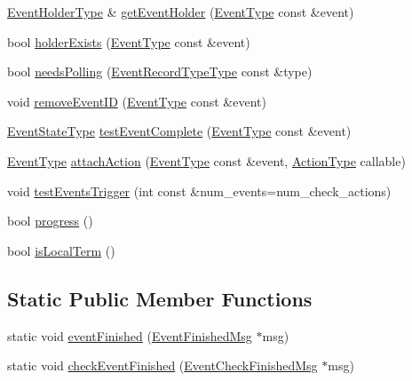 \begin{DoxyCompactItemize}
\item 
\hyperlink{structvt_1_1event_1_1_async_event_a6b529d829ccb5b12c50c2b1978c41a86}{Event\+Holder\+Type} \& \hyperlink{structvt_1_1event_1_1_async_event_a27d14dba4b35f66aad75d46fb56227a9}{get\+Event\+Holder} (\hyperlink{namespacevt_a009267401def7ae8bf201892222d060f}{Event\+Type} const \&event)
\item 
bool \hyperlink{structvt_1_1event_1_1_async_event_a8aeeb83c7b467b3d130e522d079e5a7d}{holder\+Exists} (\hyperlink{namespacevt_a009267401def7ae8bf201892222d060f}{Event\+Type} const \&event)
\item 
bool \hyperlink{structvt_1_1event_1_1_async_event_a4d6056e47909a858fcd3bfc3782b8d2d}{needs\+Polling} (\hyperlink{namespacevt_1_1event_a1ea9fec44d101bf40b8fd786d44ebed9}{Event\+Record\+Type\+Type} const \&type)
\item 
void \hyperlink{structvt_1_1event_1_1_async_event_a67a603eff81f5f912118f38fd5cbaccb}{remove\+Event\+ID} (\hyperlink{namespacevt_a009267401def7ae8bf201892222d060f}{Event\+Type} const \&event)
\item 
\hyperlink{namespacevt_1_1event_a787aca6361696d96d817a639195c429c}{Event\+State\+Type} \hyperlink{structvt_1_1event_1_1_async_event_ac14b4e2fc658f70937c591dfdc8ea083}{test\+Event\+Complete} (\hyperlink{namespacevt_a009267401def7ae8bf201892222d060f}{Event\+Type} const \&event)
\item 
\hyperlink{namespacevt_a009267401def7ae8bf201892222d060f}{Event\+Type} \hyperlink{structvt_1_1event_1_1_async_event_aa6432e2fff56eb073f9489bfc37e89bc}{attach\+Action} (\hyperlink{namespacevt_a009267401def7ae8bf201892222d060f}{Event\+Type} const \&event, \hyperlink{namespacevt_ae0a5a7b18cc99d7b732cb4d44f46b0f3}{Action\+Type} callable)
\item 
void \hyperlink{structvt_1_1event_1_1_async_event_a383418f69041085a8c76b87c3bf82f27}{test\+Events\+Trigger} (int const \&num\+\_\+events=num\+\_\+check\+\_\+actions)
\item 
bool \hyperlink{structvt_1_1event_1_1_async_event_aab5e67e52484ab9a0245f3b367433ac6}{progress} ()
\item 
bool \hyperlink{structvt_1_1event_1_1_async_event_a10af2d5cb5318e2ef25eabcd88c8139a}{is\+Local\+Term} ()
\end{DoxyCompactItemize}
\subsection*{Static Public Member Functions}
\begin{DoxyCompactItemize}
\item 
static void \hyperlink{structvt_1_1event_1_1_async_event_a2228d79f1c1f838e630dcb3325edfde3}{event\+Finished} (\hyperlink{structvt_1_1_event_finished_msg}{Event\+Finished\+Msg} $\ast$msg)
\item 
static void \hyperlink{structvt_1_1event_1_1_async_event_a5493f4402db0fffba5300246247523b9}{check\+Event\+Finished} (\hyperlink{structvt_1_1_event_check_finished_msg}{Event\+Check\+Finished\+Msg} $\ast$msg)
\end{DoxyCompactItemize}


